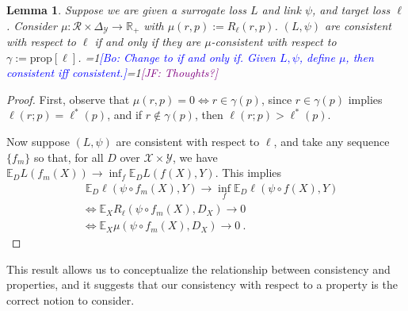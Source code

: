 \documentclass{article}
\newcommand{\Comments}{1}
\newcommand{\mynote}[2]{\ifnum\Comments=1\textcolor{#1}{#2}\fi}
\newcommand{\jessie}[1]{\mynote{purple}{[JF: #1]}}
\newcommand{\bo}[1]{\mynote{blue}{[Bo: #1]}}
\newcommand{\reals}{\mathbb{R}}
\newcommand{\simplex}{\Delta_\Y}
\newcommand{\prop}[1]{\mathrm{prop}[#1]}
\newcommand{\propdis}{\mu}
\newcommand{\E}{\mathbb{E}}
\newcommand{\R}{\mathcal{R}}
\newcommand{\X}{\mathcal{X}}
\newcommand{\Y}{\mathcal{Y}}
\newcommand{\risk}[1]{#1^*}
\newtheorem{lemma}{Lemma}
\begin{document}
\begin{lemma}\label{lem:consistent-loss-implies-prop}
	Suppose we are given a surrogate loss $L$ and link $\psi$, and target loss $\ell$.
	Consider $\propdis: \R \times \simplex \to \reals_+$ with $\mu(r,p) := R_\ell(r,p)$.
	$(L, \psi)$ are consistent with respect to $\ell$ if and only if they are $\propdis$-consistent with respect to $\gamma := \prop{\ell}$.
	\bo{Change to if and only if. Given $L,\psi$, define $\mu$, then consistent iff consistent.}\jessie{Thoughts?}
\end{lemma}
\begin{proof}
	First, observe that $\propdis(r,p) = 0 \iff r \in \gamma(p)$, since $r \in \gamma(p)$ implies $\ell(r;p) = \risk{\ell}(p)$, and if $r \not \in \gamma(p)$, then $\ell(r;p) > \risk{\ell}(p)$.
	
	Now suppose $(L, \psi)$ are consistent with respect to $\ell$, and take any sequence $\{f_m\}$ so that, for all $D$ over $\X \times \Y$, we have $\E_D L(f_m(X)) \to \inf_f \E_D L(f(X), Y)$.
	This implies 
	\begin{align*}
	&\; \E_D \ell(\psi \circ f_m(X), Y)\to \inf_f \E_D \ell(\psi \circ f(X), Y) \\
	&\iff \E_X R_\ell(\psi \circ f_m(X), D_X) \to 0\\
	&\iff \E_X \propdis(\psi \circ f_m(X), D_X) \to 0~.~
	\end{align*}
\end{proof}

This result allows us to conceptualize the relationship between consistency and properties, and it suggests that our consistency with respect to a property is the correct notion to consider.
\end{document}
